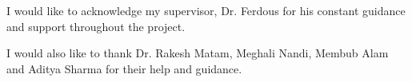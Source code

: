 
\begin{acknowledgements}
    I would like to acknowledge my supervisor, Dr. Ferdous for his constant
    guidance and support throughout the project.

    I would also like to thank Dr. Rakesh Matam, Meghali Nandi, Membub Alam and
    Aditya Sharma for their help and guidance.
\end{acknowledgements}
